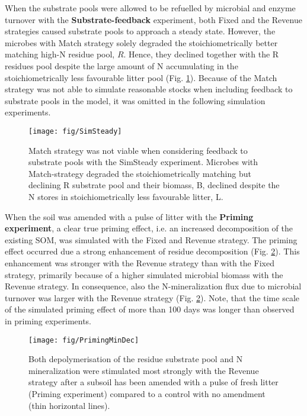 When the substrate pools were allowed to be refuelled by microbial and enzyme
turnover with the \textbf{Substrate-feedback} experiment, both Fixed and the Revenue
strategies caused substrate pools to approach a steady state.
However, the microbes with Match strategy solely degraded the stoichiometrically
better matching high-N residue pool, $R$. Hence, they declined together with the
R residues pool despite the large amount of N accumulating in the
stoichiometrically less favourable litter pool (Fig. \ref{fig:SimSteady}).
Because of the Match strategy was not able to simulate reasonable stocks when
including feedback to substrate pools in the model, it was omitted in the
following simulation experiments.

\begin{figure}[t]
\vspace*{2mm}
\begin{center} 
\texttt{[image: fig/SimSteady]} 
\end{center}
\caption{
Match strategy was not viable when considering feedback to
substrate pools with the SimSteady experiment. Microbes with
Match-strategy degraded the stoichiometrically matching but declining R
substrate pool and their biomass, B, declined despite the N stores
in stoichiometrically less favourable litter, L.
\label{fig:SimSteady}} 
\end{figure}

When the soil was amended with a pulse of litter with the \textbf{Priming
experiment}, a clear true priming effect, i.e. an increased decomposition of the
existing SOM, was simulated with the Fixed and Revenue strategy.
The priming effect occurred due a strong enhancement of residue decomposition
(Fig. \ref{fig:PrimingMinDec}). This
enhancement was stronger with the Revenue strategy than with the Fixed strategy,
primarily because of a higher simulated microbial biomass with the Revenue
strategy. In consequence, also the N-mineralization flux due to microbial
turnover was larger with the Revenue strategy (Fig. \ref{fig:PrimingMinDec}).
Note, that the time scale of the simulated priming effect of more than 100 days
was longer than observed in priming experiments.

\begin{figure}[t] \vspace*{2mm}
\begin{center}
\texttt{[image: fig/PrimingMinDec]}
\end{center}
\caption{
Both depolymerisation of the residue substrate pool and N
mineralization were stimulated most strongly with the Revenue strategy after a
subsoil has been amended with a pulse of fresh litter (Priming experiment)
compared to a control with no amendment (thin horizontal lines).
\label{fig:PrimingMinDec}}
\end{figure}

